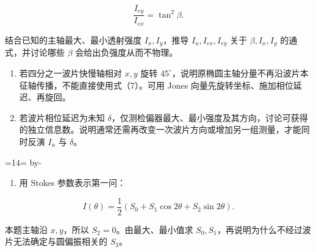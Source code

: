 \documentclass[12pt,a4paper,UTF8]{ctexart}
\newcommand{\Needspace}[1]{\par\begingroup\dimen0=#1\relax\dimen2=\pagegoal\advance\dimen2 by-\pagetotal\ifdim\dimen0>\dimen2\newpage\fi\endgroup}
\newcommand{\tightlist}{\setlength{\itemsep}{0pt}\setlength{\parskip}{0pt}}
\begin{document}
\[
\frac{I_{ey}}{I_{ex}}=\tan^2\beta.
\]

结合已知的主轴最大、最小透射强度 \(I_x,I_y\)，推导 \(I_u,I_{ex},I_{ey}\)
关于 \(\beta,I_x,I_y\) 的通式，并讨论哪些 \(\beta\)
会给出负强度从而不物理。

\begin{enumerate}
\def\labelenumi{\arabic{enumi}.}
\setcounter{enumi}{2}
\item
  若四分之一波片快慢轴相对 \(x,y\) 旋转
  \(45^\circ\)，说明原椭圆主轴分量不再沿波片本征轴传播，不能直接使用式（7）。可用
  Jones 向量先旋转坐标、施加相位延迟、再旋回。
\item
  若波片相位延迟为未知
  \(\delta\)，仅测检偏器最大、最小强度及其方向，讨论可获得的独立信息数。说明通常还需再改变一次波片方向或增加另一组测量，才能同时反演
  \(I_u\) 与 \(\delta\)。
\end{enumerate}

\Needspace{14\baselineskip}

\begin{enumerate}
\def\labelenumi{\arabic{enumi}.}
\setcounter{enumi}{4}
\tightlist
\item
  用 Stokes 参数表示第一问：
\end{enumerate}

\[
I(\theta)=\frac12\left(S_0+S_1\cos2\theta+S_2\sin2\theta\right).
\]

本题主轴沿 \(x,y\)，所以 \(S_2=0\)。由最大、最小值求
\(S_0,S_1\)，再说明为什么不经过波片无法确定与圆偏振相关的 \(S_3\)。
\end{document}
